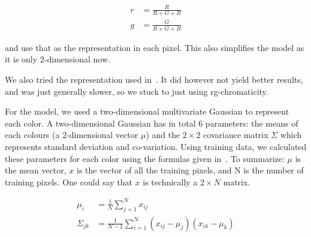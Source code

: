 \documentclass[10pt,a4paper,twocolumn]{article}
\begin{document}
\begin{align}
  r &= \frac{R}{R+G+B}\\
  g &= \frac{G}{R+G+B}
\end{align}

and use that as the representation in each pixel. This also simplifies the model
as it is only 2-dimensional now.

We also tried the representation used in~\cite{balkenius2007finding}. It did
however not yield better results, and was just generally slower, so we stuck to
just using rg-chromaticity.

For the model, we used a two-dimensional multivariate Gaussian to represent each
color. A two-dimensional Gaussian has in total 6 parameters: the means of each
colours (a 2-dimensional vector $\mu$) and the $2\times 2$ covariance matrix $\Sigma$
which represents standard deviation and co-variation. Using training data, we
calculated these parameters for each color using the formulas given
in~\cite{smean}. To summarize: $\mu$ is the mean vector, $x$ is the vector of all the
training pixels, and N is the number of training pixels. One could say that $x$ is
technically a $2\times N$ matrix.

\begin{align}
  \mu_i&=\frac{1}{N}\sum_{j=1}^Nx_{ij}\\
  \Sigma_{jk}&=\frac{1}{N-1}\sum_{i=1}^N(x_{ij}-\mu_j)(x_{ik}-\mu_k)
\end{align}
\end{document}
